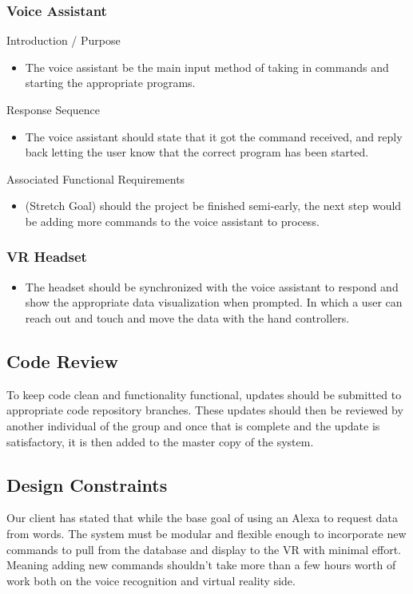 \documentclass[onecolumn, draftclsnofoot,10pt, compsoc]{IEEEtran}
\begin{document}
        \subsubsection{Voice Assistant}
            Introduction / Purpose
            \begin{itemize}
                \item The voice assistant be the main input method of taking in commands and starting the appropriate programs.
            \end{itemize}
            Response Sequence
            \begin{itemize}
                \item The voice assistant should state that it got the command received, and reply back letting the user know that the correct program has been started.
            \end{itemize}
            Associated Functional Requirements
            \begin{itemize}
                \item (Stretch Goal) should the project be finished semi-early, the next step would be adding more commands to the voice assistant to process. 

            \end{itemize}
        \subsubsection{VR Headset}
            \begin{itemize}
                    \item The headset should be synchronized with the voice assistant to respond and show the appropriate data visualization when prompted. In which a user can reach out and touch and move the data with the hand controllers. 
            \end{itemize}
            
        \subsection{Code Review}
            To keep code clean and functionality functional, updates should be submitted to appropriate code repository branches. These updates should then be reviewed by another individual of the group and once that is complete and the update is satisfactory, it is then added to the master copy of the system.
    
    \subsection{Design Constraints}
        Our client has stated that while the base goal of using an Alexa to request data from words. The system must be modular and flexible enough to incorporate new commands to pull from the database and display to the VR with minimal effort. Meaning adding new commands shouldn’t take more than a few hours worth of work both on the voice recognition and virtual reality side. 
\end{document}
